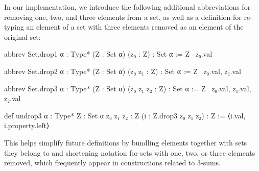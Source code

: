 In our implementation, we introduce the following additional abbreviations for removing one, two, and three elements from a set, as well as a definition for re-typing an element of a set with three elements removed as an element of the original set:
\begin{leancode}
abbrev Set.drop1 {α : Type*} (Z : Set α)
    (z₀ : Z) : Set α :=
  Z \ {z₀.val}
\end{leancode}
\begin{leancode}
abbrev Set.drop2 {α : Type*} (Z : Set α)
    (z₀ z₁ : Z) : Set α :=
  Z \ {z₀.val, z₁.val}
\end{leancode}
\begin{leancode}
abbrev Set.drop3 {α : Type*} (Z : Set α)
    (z₀ z₁ z₂ : Z) : Set α :=
  Z \ {z₀.val, z₁.val, z₂.val}
\end{leancode}
\begin{leancode}
def undrop3 {α : Type*} {Z : Set α}
    {z₀ z₁ z₂ : Z} (i : Z.drop3 z₀ z₁ z₂) : Z :=
  ⟨i.val, i.property.left⟩
\end{leancode}
This helps simplify future definitions by bundling elements together with sets they belong to and shortening notation for sets with one, two, or three elements removed, which frequently appear in constructions related to 3-sums.



